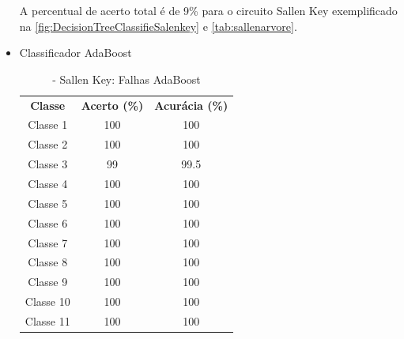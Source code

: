 \begin{itemize}
        

A percentual de acerto total é de 9\% para o circuito Sallen Key exemplificado na \ref{fig:DecisionTreeClassifieSalenkey} e \ref{tab:sallenarvore}. 
\newpage
 \item Classificador AdaBoost
 
 \begin{table}[ht]
\centering
\begin{tabular}{ccc}
\textbf{Classe} & \textbf{Acerto (\%)} & \textbf{Acurácia (\%)} \\
Classe 1        & 100                  & 100                    \\
Classe 2        & 100                  & 100                    \\
Classe 3        & 99                  & 99.5                    \\
Classe 4        & 100                  & 100                    \\
Classe 5        & 100                  & 100                    \\
Classe 6        & 100                  & 100                    \\
Classe 7        & 100                  & 100                    \\
Classe 8        & 100                  & 100                    \\
Classe 9        & 100                  & 100                    \\
Classe 10       & 100                  & 100                    \\
Classe 11       & 100                  & 100                               
\end{tabular}
\caption{\label{tab:sallenAdaBoost}- Sallen Key: Falhas AdaBoost}
\end{table}



\end{itemize}
